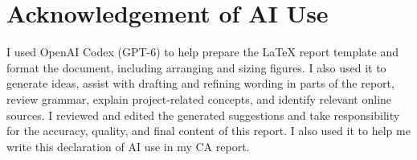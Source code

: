 \documentclass[11pt,a4paper]{report}
\begin{document}
\printbibliography[title={References}]

\chapter*{Acknowledgement of AI Use}
I used OpenAI Codex (GPT-6) to help prepare the LaTeX report template and format the document, including arranging and sizing figures. I also used it to generate ideas, assist with drafting and refining wording in parts of the report, review grammar, explain project-related concepts, and identify relevant online sources. I reviewed and edited the generated suggestions and take responsibility for the accuracy, quality, and final content of this report. I also used it to help me write this declaration of AI use in my CA report.
\end{document}

